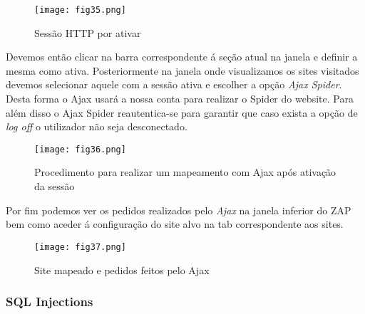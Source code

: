 \begin{figure}[H]

  \centering

  \texttt{[image: fig35.png]}

  \caption{Sessão HTTP por ativar}

\end{figure}

Devemos então clicar na barra correspondente á seção atual na janela e definir a mesma como ativa. Posteriormente na janela onde visualizamos os sites visitados devemos selecionar aquele com a sessão ativa e escolher a opção \textit{Ajax Spider}. Desta forma o Ajax usará a nossa conta para realizar o Spider do website. Para além disso o Ajax Spider reautentica-se para garantir que caso exista a opção de \textit{log off} o utilizador não seja desconectado.

\begin{figure}[H]

  \centering

  \texttt{[image: fig36.png]}

  \caption{Procedimento para realizar um mapeamento com Ajax após ativação da sessão}

\end{figure}

Por fim podemos ver os pedidos realizados pelo \textit{Ajax} na janela inferior do ZAP bem como aceder á configuração do site alvo na tab correspondente aos sites.  

\begin{figure}[H]

  \centering

  \texttt{[image: fig37.png]}

  \caption{Site mapeado e pedidos feitos pelo Ajax}

\end{figure}










\subsubsection{SQL Injections}

